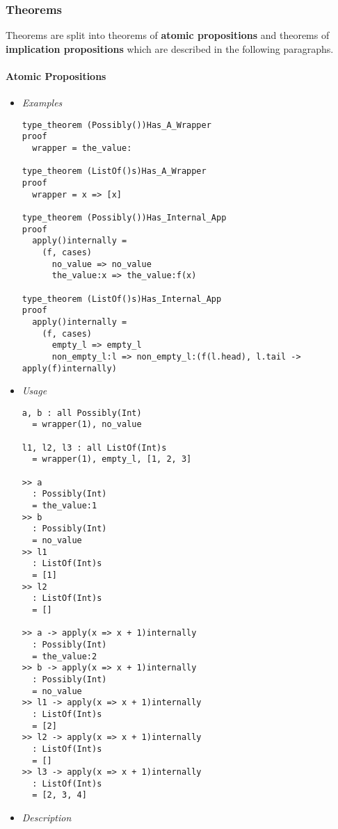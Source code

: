\documentclass{article}
\begin{document}
\subsubsection{Theorems}
\label{subsubsec:ttheo}

Theorems are split into theorems of \textbf{atomic propositions} and
theorems of \textbf{implication propositions} which are described in the
following paragraphs.

\paragraph{Atomic Propositions}

\begin{itemize}
\item \textit{Examples}

\begin{verbatim}
type_theorem (Possibly())Has_A_Wrapper
proof
  wrapper = the_value:

type_theorem (ListOf()s)Has_A_Wrapper
proof
  wrapper = x => [x]

type_theorem (Possibly())Has_Internal_App
proof
  apply()internally =
    (f, cases)
      no_value => no_value
      the_value:x => the_value:f(x)

type_theorem (ListOf()s)Has_Internal_App
proof
  apply()internally =
    (f, cases)
      empty_l => empty_l
      non_empty_l:l => non_empty_l:(f(l.head), l.tail -> apply(f)internally)
\end{verbatim}

\item \textit{Usage}

\begin{verbatim} 
a, b : all Possibly(Int)
  = wrapper(1), no_value

l1, l2, l3 : all ListOf(Int)s
  = wrapper(1), empty_l, [1, 2, 3]

>> a
  : Possibly(Int)
  = the_value:1
>> b
  : Possibly(Int)
  = no_value
>> l1
  : ListOf(Int)s
  = [1]
>> l2
  : ListOf(Int)s
  = []

>> a -> apply(x => x + 1)internally
  : Possibly(Int)
  = the_value:2
>> b -> apply(x => x + 1)internally
  : Possibly(Int)
  = no_value
>> l1 -> apply(x => x + 1)internally
  : ListOf(Int)s
  = [2]
>> l2 -> apply(x => x + 1)internally
  : ListOf(Int)s
  = []
>> l3 -> apply(x => x + 1)internally
  : ListOf(Int)s
  = [2, 3, 4]
\end{verbatim}

\item \textit{Description}


\end{itemize}
\end{document}
